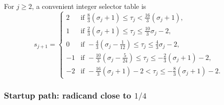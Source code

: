 \documentclass[11pt]{article}
\numberwithin{equation}{section}
\begin{document}
For $j\ge 2$, a convenient integer selector table is
\begin{equation}
  \label{eq:sqrt:radix4_logic}
  s_{j+1} =
  \begin{cases}
    2  & \text{if } \frac{8}{3}(\sigma_j+1) \le \tau_j < \frac{16}{3}(\sigma_j+1), \\
    1  & \text{if } \frac{2}{3}(\sigma_j+1) \le \tau_j \le \frac{10}{3}\sigma_j - 2, \\
    0  & \text{if } -\frac{4}{3}\left(\sigma_j - \frac{1}{12}\right) \le \tau_j \le \frac{4}{3}\sigma_j - 2, \\
    -1 & \text{if } -\frac{10}{3}\left(\sigma_j - \frac{5}{24}\right) \le \tau_j \le -\frac{2}{3}(\sigma_j+1) - 2, \\
    -2 & \text{if } -\frac{16}{3}(\sigma_j+1) - 2 < \tau_j \le -\frac{8}{3}(\sigma_j+1) - 2.
  \end{cases}
\end{equation}

\subsubsection{Startup path: radicand close to \texorpdfstring{$1/4$}{1/4}}
\label{sssec:sqrt:radix4_near_quarter}
\end{document}
